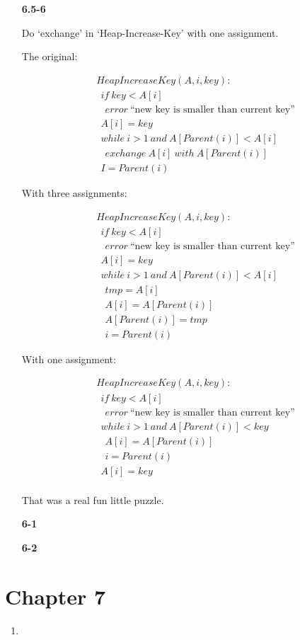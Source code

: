 \documentclass{article}
\begin{document}
\begin{enumerate}

\item[\textbf{6.5-6}]

Do `exchange' in `Heap-Increase-Key' with one assignment.

The original:

\begin{align*}
& HeapIncreaseKey(A, i, key): \\
& \ \ if\ key < A[i] \\
& \ \ \ \ error \ \text{``new key is smaller than current key''} \\
& \ \ A[i] = key \\
& \ \ while\ i > 1\ and\ A[Parent(i)] < A[i] \\
& \ \ \ \ exchange\ A[i]\ with\ A[Parent(i)] \\
& \ \ I = Parent(i)
\end{align*}

With three assignments:

\begin{align*}
& HeapIncreaseKey(A, i, key): \\
& \ \ if\ key < A[i] \\
& \ \ \ \ error \ \text{``new key is smaller than current key''} \\
& \ \ A[i] = key \\
& \ \ while\ i > 1\ and\ A[Parent(i)] < A[i] \\
& \ \ \ \ tmp = A[i] \\
& \ \ \ \ A[i] = A[Parent(i)] \\
& \ \ \ \ A[Parent(i)] = tmp \\
& \ \ \ \ i = Parent(i)
\end{align*}

With one assignment:

\begin{align*}
& HeapIncreaseKey(A, i, key): \\
& \ \ if\ key < A[i] \\
& \ \ \ \ error \ \text{``new key is smaller than current key''} \\
& \ \ while\ i > 1\ and\ A[Parent(i)] < key \\
& \ \ \ \ A[i] = A[Parent(i)] \\
& \ \ \ \ i = Parent(i) \\
& \ \ A[i] = key \\
\end{align*}

That was a real fun little puzzle.

\item[\textbf{6-1}]

\item[\textbf{6-2}]

\end{enumerate}

\section*{Chapter 7}

\begin{enumerate}

\item

\end{enumerate}
\end{document}

